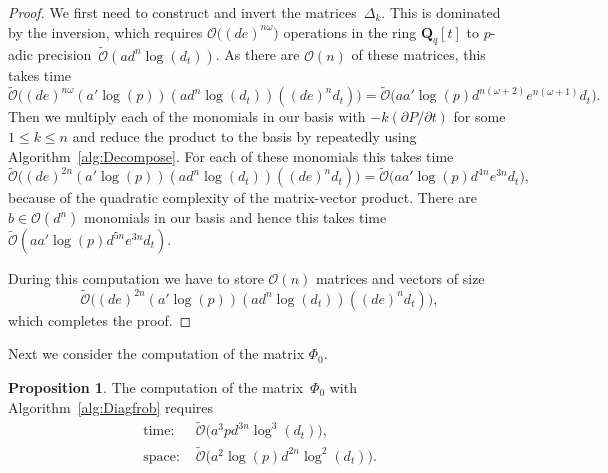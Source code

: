 \documentclass[a4paper,11pt]{article}
\numberwithin{equation}{section}
\newcommand{\QQ}{\mathbf{Q}} %
\providecommand{\BigOh}{\mathcal{O}}          %
\providecommand{\SoftOh}{\tilde{\mathcal{O}}} %
\theoremstyle{definition}
\newtheorem{prop}[thm]{Proposition}
\begin{document}
\begin{proof}
We first need to construct and invert the matrices~$\Delta_k$.  This is 
dominated by the inversion, which requires $\BigOh\bigl((de)^{n \omega}\bigr)$ 
operations in the ring $\QQ_q[t]$ to $p$-adic 
precision~$\SoftOh(a d^n \log(d_t))$. As there are $\BigOh(n)$ of 
these matrices, this takes time 
\[
\SoftOh\bigl((de)^{n \omega} (a' \log(p)) (a d^n \log(d_t)) ((de)^n d_t)\bigr) = 
    \SoftOh\bigl(a a' \log(p) d^{n(\omega+2)} e^{n(\omega+1)} d_t\bigr).
\]
Then we multiply each of the monomials in our basis with 
$-k (\partial P / \partial t)$ for some $1 \leq k \leq n$ and 
reduce the product to the basis by repeatedly using 
Algorithm~\ref{alg:Decompose}.  For each of these monomials this 
takes time 
\[
\SoftOh\bigl((de)^{2n} (a' \log(p)) (a d^n \log(d_t)) ((de)^n d_t)\bigr) = 
    \SoftOh\bigl(a a' \log(p) d^{4n}e^{3n} d_t\bigr),
\]
because of the quadratic complexity of the matrix-vector product.  
There are $b \in \BigOh(d^n)$ monomials in our basis and hence this 
takes time $\SoftOh(a a' \log(p) d^{5n}e^{3n} d_t)$.

During this computation we have to store $\BigOh(n)$ matrices 
and vectors of size 
\[
\SoftOh\bigl((de)^{2n} (a' \log(p)) (a d^n \log(d_t)) ((de)^n d_t)\bigr),
\] 
which completes the proof.
\end{proof}

Next we consider the computation of the matrix $\Phi_0$.

\begin{prop} \label{prop:complexityPhi0}
The computation of the matrix~$\Phi_0$ with Algorithm~\ref{alg:Diagfrob} requires
\begin{align*}
\mbox{time: }  & \SoftOh\bigl(a^3 p d^{3n} \log^3(d_t)\bigr), \\
\mbox{space: } & \SoftOh\bigl(a^2 \log(p) d^{2n} \log^2(d_t)\bigr).
\end{align*}
\end{prop}
\end{document}

